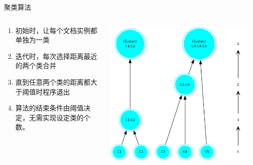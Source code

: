 \documentclass[presentation]{beamer}
\begin{document}
\begin{frame}[label=sec-2-14]{聚类算法}
\begin{columns}
\begin{column}{0.4\textwidth}
\begin{enumerate}
\item 初始时，让每个文档实例都单独为一类
\item 迭代时，每次选择距离最近的两个类合并
\item 直到任意两个类的距离都大于阈值时程序退出
\item 算法的结束条件由阈值决定，无需实现设定类的个数。
\end{enumerate}

\end{column}

\begin{column}{0.5\textwidth}
\includegraphics[width=\textwidth]{./aggloclustering.png}

\end{column}
\end{columns}
\end{frame}
\end{document}

